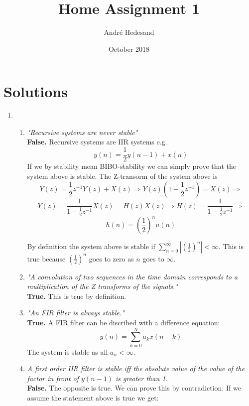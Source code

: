 \documentclass{article}
\title{Home Assignment 1}
\author{André Hedesand}
\date{October 2018}
\begin{document}
\maketitle

\section{Solutions}

\begin{enumerate}
    \item
    \begin{enumerate}
        \item %
            \emph{"Recursive systems are never stable"}
            \\
            \textbf{False.} 
            Recursive systems are IIR systems e.g. 
            $$ y(n) = \frac{1}{2}y(n-1) + x(n) $$
            If we by stability mean BIBO-stability we can simply prove that the system above is stable. The Z-transorm of the system above is
            $$ 
            Y(z) = \frac{1}{2}z^{-1}Y(z) + X(z) \Rightarrow
            Y(z)(1 - \frac{1}{2}z^{-1}) = X(z) \Rightarrow
            $$
            $$
            Y(z) = \frac{1}{1 - \frac{1}{2}z^{-1}}X(z) = 
            H(z) X(z) \Rightarrow 
            H(z) = \frac{1}{1 - \frac{1}{2}z^{-1}} \Rightarrow
            $$
            $$
            h(n) = (\frac{1}{2})^{n} u(n)
            $$
            
            By definition the system above is stable if
            $ \sum_{n=0}^{\infty} |(\frac{1}{2})^{n}| < \infty $.
            This is true because $(\frac{1}{2})^{n}$ goes to zero as $n$ goes to $\infty$.
        
        \item %
            \emph{"A convolution of two sequences in the time domain corresponds to a multiplication of the Z transforms of the signals."}
            \\
            \textbf{True.} This is true by definition.
        
        \item %
            \emph{"An FIR filter is always stable."}
            \\
            \textbf{True.}
            A FIR filter can be discribed with a difference equation:
            $$ y(n) = \sum_{k=0}^{N} a_k x(n-k)$$
            The system is stable as all $a_n < \infty$.
            
        \item %
            \emph{A first order IIR filter is stable iff the absolute value of the value of the factor in front of $y(n-1)$ is greater than 1.}
            \\
            \textbf{False.} The opposite is true. We can prove this by contradiction: If we assume the statement above is true we get:
            

\end{enumerate}
\end{enumerate}
\end{document}

